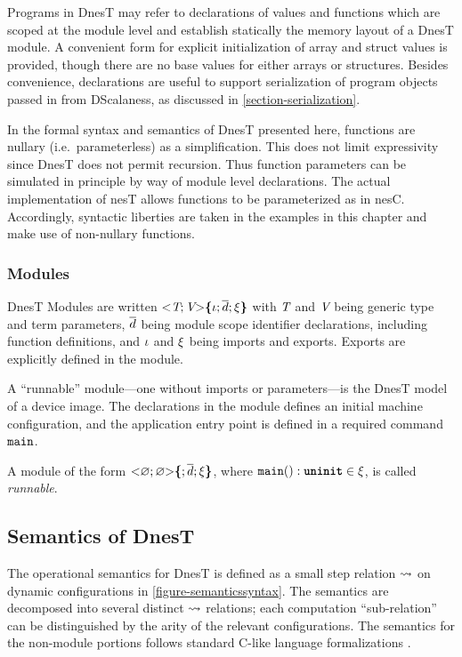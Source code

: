 Programs in DnesT may refer to declarations of values and functions which are scoped at the
module level and establish statically the memory layout of a DnesT module. A convenient form for
explicit initialization of array and struct values is provided, though there are no base values
for either arrays or structures. Besides convenience, declarations are useful to support
serialization of program objects passed in from DScalaness, as discussed in
\autoref{section-serialization}.

In the formal syntax and semantics of DnesT presented here, functions are nullary
(i.e.~parameterless) as a simplification. This does not limit expressivity since DnesT does not
permit recursion. Thus function parameters can be simulated in principle by way of module level
declarations. The actual implementation of nesT allows functions to be parameterized as in nesC.
Accordingly, syntactic liberties are taken in the examples in this chapter and make use of
non-nullary functions.

\subsubsection{Modules}

DnesT Modules are written $\margs{\tpdecl; \vpdecl}\lc \imports; \decls \exports \rc$ with
$\tpdecl$ and $\vpdecl$ being generic type and term parameters, $\vect{d}$ being module scope
identifier declarations, including function definitions, and $\imports$ and $\exports$ being
imports and exports. Exports are explicitly defined in the module.

A ``runnable'' module---one without imports or parameters---is the DnesT model of a device
image. The declarations in the module defines an initial machine configuration, and the
application entry point is defined in a required command $\tt{main}$.
\begin{definition}
\label{definition-runnable}
A module of the form $\margs{\varnothing; \varnothing }\lc ; \vect{\decl}; \exports\rc$, where
$\tt{main}() : \undefv \in \exports$, is called \emph{runnable}.
\end{definition}

\subsection{Semantics of DnesT} 
\label{section-dnestsemantics}

The operational semantics for DnesT is defined as a small step relation $\compute$ on dynamic
configurations in \autoref{figure-semanticssyntax}. The semantics are decomposed into several
distinct $\compute$ relations; each computation ``sub-relation'' can be distinguished by the
arity of the relevant configurations. The semantics for the non-module portions follows standard
C-like language formalizations \cite{Leroy-compcert-06,grossman03}.

